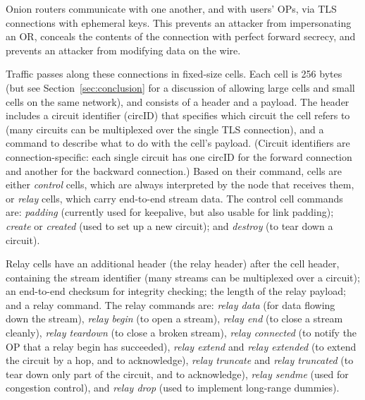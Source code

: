 \documentclass[times,10pt,twocolumn]{article}
\begin{document}
\label{subsec:cells}

Onion routers communicate with one another, and with users' OPs, via TLS
connections with ephemeral keys.  This prevents an attacker from
impersonating an OR, conceals the contents of the connection with
perfect forward secrecy, and prevents an attacker from modifying data
on the wire.

Traffic passes along these connections in fixed-size cells.  Each cell
is 256 bytes (but see Section~\ref{sec:conclusion} for a discussion of
allowing large cells and small cells on the same network), and
consists of a header and a payload. The header includes a circuit
identifier (circID) that specifies which circuit the cell refers to
(many circuits can be multiplexed over the single TLS connection), and
a command to describe what to do with the cell's payload.  (Circuit
identifiers are connection-specific: each single circuit has one circID
for the forward connection and another for the backward connection.)
Based on their command, cells are either \emph{control} cells, which are
always interpreted by the node that receives them, or \emph{relay} cells,
which carry end-to-end stream data.   The control cell commands are:
\emph{padding} (currently used for keepalive, but also usable for link
padding); \emph{create} or \emph{created} (used to set up a new circuit);
and \emph{destroy} (to tear down a circuit).

Relay cells have an additional header (the relay header) after the
cell header, containing the stream identifier (many streams can
be multiplexed over a circuit); an end-to-end checksum for integrity
checking; the length of the relay payload; and a relay command.  
The
relay commands are: \emph{relay
data} (for data flowing down the stream), \emph{relay begin} (to open a
stream), \emph{relay end} (to close a stream cleanly), \emph{relay
teardown} (to close a broken stream), \emph{relay connected}
(to notify the OP that a relay begin has succeeded), \emph{relay
extend} and \emph{relay extended} (to extend the circuit by a hop,
and to acknowledge), \emph{relay truncate} and \emph{relay truncated}
(to tear down only part of the circuit, and to acknowledge), \emph{relay
sendme} (used for congestion control), and \emph{relay drop} (used to
implement long-range dummies).
\end{document}
